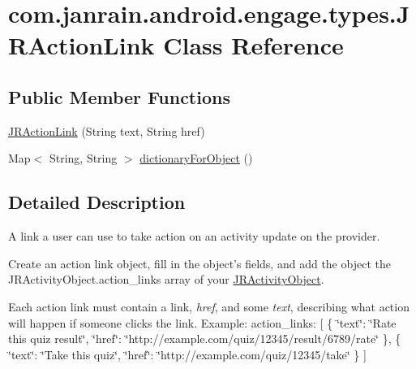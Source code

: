 \hypertarget{classcom_1_1janrain_1_1android_1_1engage_1_1types_1_1_j_r_action_link}{
\section{com.janrain.android.engage.types.JRActionLink Class Reference}
\label{classcom_1_1janrain_1_1android_1_1engage_1_1types_1_1_j_r_action_link}
}
\subsection*{Public Member Functions}
\begin{DoxyCompactItemize}
\item 
\hyperlink{classcom_1_1janrain_1_1android_1_1engage_1_1types_1_1_j_r_action_link_a4a5c9c01ed02d9234ccae5ad402cd10e}{JRActionLink} (String text, String href)
\item 
Map$<$ String, String $>$ \hyperlink{classcom_1_1janrain_1_1android_1_1engage_1_1types_1_1_j_r_action_link_aeebae3cd3eb70a0e86015a30cfa4cfe1}{dictionaryForObject} ()
\end{DoxyCompactItemize}


\subsection{Detailed Description}
A link a user can use to take action on an activity update on the provider.

Create an action link object, fill in the object's fields, and add the object the JRActivityObject.action\_\-links array of your \hyperlink{classcom_1_1janrain_1_1android_1_1engage_1_1types_1_1_j_r_activity_object}{JRActivityObject}.

Each action link must contain a link, {\itshape href\/}, and some {\itshape text\/}, describing what action will happen if someone clicks the link. Example: {\ttfamily  action\_\-links: \mbox{[} \{ \char`\"{}text\char`\"{}: \char`\"{}Rate this quiz result\char`\"{}, \char`\"{}href\char`\"{}: \char`\"{}http://example.com/quiz/12345/result/6789/rate\char`\"{} \}, \{ \char`\"{}text\char`\"{}: \char`\"{}Take this quiz\char`\"{}, \char`\"{}href\char`\"{}: \char`\"{}http://example.com/quiz/12345/take\char`\"{} \} \mbox{]} } 

